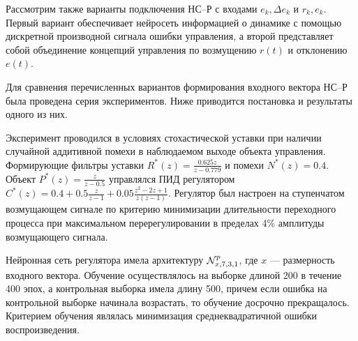 Рассмотрим также варианты подключения НС--Р с входами $e_k,\Delta e_k$
и $r_k,e_k$.  Первый вариант обеспечивает нейросеть информацией о
динамике с помощью дискретной производной сигнала ошибки управления, а
второй представляет собой объединение концепций управления по
возмущению $r(t)$ и отклонению $e(t)$.

Для сравнения перечисленных вариантов формирования входного вектора
НС--Р была проведена серия экспериментов.  Ниже приводится постановка
и результаты одного из них.

Эксперимент проводился в условиях стохастической уставки при наличии
случайной аддитивной помехи в наблюдаемом выходе объекта управления.
Формирующие фильтры уставки $R^*(z)=\frac{0.625z}{z-0.779}$ и помехи
$N^*(z)=0.4$.  Объект $P^*(z)=\frac{z}{z-0.5}$ управлялся ПИД
регулятором $C^*(z)=0.4 + 0.5\frac{z}{z-1} +
0.05\frac{z^2-2z+1}{z(z-1)}$.  Регулятор был настроен на ступенчатом
возмущающем сигнале по критерию минимизации длительности переходного
процесса при максимальном перерегулировании в пределах 4\% амплитуды
возмущающего сигнала.

Нейронная сеть регулятора имела архитектуру $\mathcal{N}^p_{x,7,3,1}$,
где $x$ --- размерность входного вектора.  Обучение осуществлялось на
выборке длиной 200 в течение 400 эпох, а контрольная выборка имела
длину 500, причем если ошибка на контрольной выборке начинала
возрастать, то обучение досрочно прекращалось.  Критерием обучения
являлась минимизация среднеквадратичной ошибки воспроизведения.

